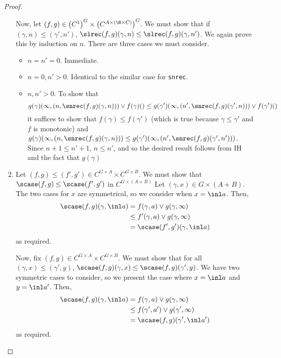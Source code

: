 \begin{proof}
\begin{enumerate}
    Now, let $(f,g) \in {\left(C^1\right)^G} \times {\left(C^{A \times (\N \times C)}\right)^G}$. We must show that if $(\gamma,n) \leq (\gamma',n')$, $\slrec(f,g)(\gamma,n) \leq \slrec(f,g)(\gamma,n')$. We again prove this by induction on $n$. There are three cases we must consider.
    \begin{itemize}
      \item $n = n' = 0$. Immediate.
      \item $n = 0, n' > 0$. Identical to the similar case for \texttt{snrec}.
      \item $n,n' > 0$. To show that 
      $$g(\gamma)(\infty,(n,\snrec(f,g)(\gamma,n))) \vee f(\gamma)() \leq g(\gamma')(\infty,(n',\snrec(f,g)(\gamma',n))) \vee f(\gamma')()$$
      it suffices to show that $f(\gamma) \leq f(\gamma')$ (which is true because $\gamma \leq \gamma'$ and $f$ is monotonic) and $g(\gamma)(\infty,(n,\snrec(f,g)(\gamma,n))) \leq g(\gamma')(\infty,(n',\snrec(f,g)(\gamma',n')))$. Since $n + 1 \leq n'+1$, $n \leq n'$, and so the desired result follows from IH and the fact that $g(\gamma)$
    \end{itemize}
    
  \item Let $(f,g) \leq (f',g') \in C^{G \times A}\times C^{G \times B}$. We must show that $\scase(f,g) \leq \scase(f',g')$ in $C^{G \times (A + B)}$ Let $(\gamma,x) \in G \times (A+B)$. The two cases for $x$ are symmetrical, so we consider when $x = \inl a$. Then,
    \begin{align*}
      \scase(f,g)(\gamma,\inl a) &= f(\gamma,a) \vee g(\gamma,\infty)\\
                                 &\leq f'(\gamma,a) \vee g(\gamma,\infty)\\
                                 &= \scase(f',g')(\gamma,\inl a)
    \end{align*}
    as required.
    
    Now, fix $(f,g) \in C^{G \times A}\times C^{G \times B}$. We must show that for all $(\gamma,x) \leq (\gamma',y)$, $\scase(f,g)(\gamma,x) \leq \scase(f,g)(\gamma',y)$. We have two symmetric cases to consider, so we present the case where $x = \inl a$ and $y = \inl a'$. Then,
    \begin{align*}
      \scase(f,g)(\gamma,\inl a) &= f(\gamma,a) \vee g(\gamma,\infty)\\
                                 &\leq f(\gamma',a') \vee g(\gamma',\infty)\\
                                 &= \scase(f,g)(\gamma',\inl a')
    \end{align*}
    as required.
\end{enumerate}
\end{proof}